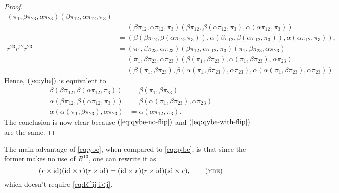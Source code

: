 \begin{proof}
\begin{align*}
                (\pi_1,\beta\pi_{23},\alpha\pi_{23})
                (\beta\pi_{12},\alpha\pi_{12},\pi_3)\\
            &= (\beta\pi_{12},\alpha\pi_{12},\pi_3)
                (\beta\pi_{12},\beta(\alpha\pi_{12},\pi_3)
                ,\alpha(\alpha\pi_{12},\pi_3))\\
            &= (\beta(\beta\pi_{12}
                ,\beta(\alpha\pi_{12},\pi_3))
                ,\alpha(\beta\pi_{12},\beta(\alpha\pi_{12},\pi_3))
                ,\alpha(\alpha\pi_{12},\pi_3)),\\
        r^{23}r^{12}r^{23} &= (\pi_1,\beta\pi_{23},\alpha\pi_{23})
                (\beta\pi_{12},\alpha\pi_{12},\pi_3)
                (\pi_1,\beta\pi_{23},\alpha\pi_{23})\\
            &= (\pi_1,\beta\pi_{23},\alpha\pi_{23})
                (\beta(\pi_1,\beta\pi_{23})
                ,\alpha(\pi_1,\beta\pi_{23})
                ,\alpha\pi_{23})\\
            &= (\beta(\pi_1,\beta\pi_{23})
                ,\beta(\alpha(\pi_1,\beta\pi_{23}),\alpha\pi_{23})
                ,\alpha(\alpha(\pi_1,\beta\pi_{23}),\alpha\pi_{23}))
    \end{align*}
    Hence, $(\ref{eq:ybe})$ is equivalent to
    \begin{align}\label{eq:qybe-with-flip}
        \beta(\beta\pi_{12},\beta(\alpha\pi_{12},\pi_3))
            &= \beta(\pi_1,\beta\pi_{23})\nonumber\\
        \alpha(\beta\pi_{12},\beta(\alpha\pi_{12},\pi_3))
            &= \beta(\alpha(\pi_1,\beta\pi_{23}),\alpha\pi_{23})\\
        \alpha(\alpha(\pi_1,\beta\pi_{23}),\alpha\pi_{23})
            &= \alpha(\alpha\pi_{12},\pi_3).\nonumber
    \end{align}
    The conclusion is now clear because $(\ref{eq:qybe-no-flip})$ and $(\ref{eq:qybe-with-flip})$ are the same.
\end{proof}

\begin{rem}
    The main advantage of \eqref{eq:ybe}, when compared to \eqref{eq:qybe}, is that since the former makes no use of $R^{13}$, one can rewrite it as
    \begin{equation}\label{eq:simpler-ybe}
        (r\times\id)({\id}\times r)(r\times\id)
            = ({\id}\times r)(r\times\id)({\id}\times r),
            \tag{\textsc{ybe}}
    \end{equation}
    which doesn't require \eqref{eq:R^ij-i<j}.
\end{rem}

